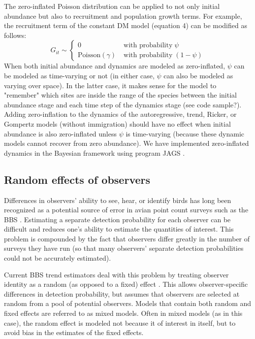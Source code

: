 \documentclass[12pt]{article}
\begin{document}
The zero-inflated Poisson distribution can be applied to not only
initial abundance but also to recruitment and population growth terms.
For example, the recruitment term of the constant DM model (equation
4) can be modified as follows:
\begin{equation}
G_{it} \sim \left\{
\begin{aligned}
0 &\; \text{with probability} \; \psi \\
\mathrm{Poisson}(\gamma) &\; \text{with probability} \; (1-\psi)
\end{aligned} \right.
\label{eq:ZIPts}
\end{equation}
When both initial abundance and dynamics are modeled as zero-inflated,
$\psi$ can be modeled as time-varying or not (in either case, $\psi$ can also be
modeled as varying over space).  In the latter case, it makes sense
for the model to "remember" which sites are inside the range of the
species between the initial abundance stage and each time step of the
dynamics stage (see code sample?).  Adding zero-inflation to the
dynamics of the autoregressive, trend, Ricker, or Gompertz models
(without immigration) should have no effect when initial abundance is
also zero-inflated unless $\psi$ is time-varying (because these dynamic
models cannot recover from zero abundance).  We have implemented
zero-inflated dynamics in the Bayesian framework using program
\textrm{JAGS} \citep[version 3.2.0]{plummer:2003}.


\subsection{Random effects of observers}

Differences in observers' ability to see, hear, or identify
birds has long been recognized as a potential source of error
in avian point count surveys such as the BBS
\citep{robbins_etal:1986,diefenbach_etal:2003,sauer_etal:1994auk,alldredge_etal:2007auk,campbell_francis:2011}.
Estimating a separate detection probability for each observer can be
difficult and reduces one's ability to estimate the quantities
of interest.  This problem is compounded by the fact that
observers differ greatly in the number of surveys they have
run (so that many observers' separate detection probabilities
could not be accurately estimated).

Current BBS trend estimators deal with this problem by
treating observer identity as a random (as opposed to a fixed)
effect \citep{link_sauer:2002,sauer_link:2011}.
This allows observer-specific differences in detection probability,
but assumes that observers are selected at random from a pool
of potential observers.  Models that contain both random and
fixed effects are referred to as mixed models.  Often in mixed
models (as in this case), the random effect is modeled not
because it of interest in itself, but to avoid bias in the
estimates of the fixed effects.
\end{document}
